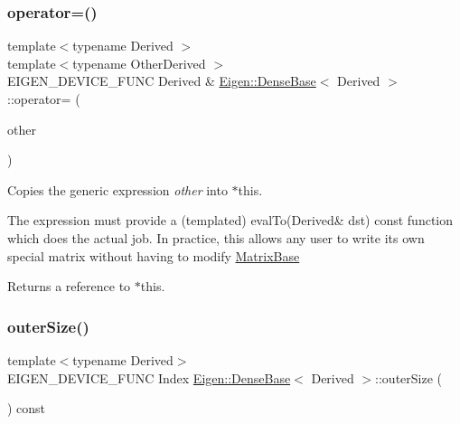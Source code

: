 \subsubsection{\texorpdfstring{operator=()}{operator=()}\hspace{0.1cm}{\footnotesize\ttfamily [3/3]}}
{\footnotesize\ttfamily template$<$typename Derived $>$ \\
template$<$typename Other\+Derived $>$ \\
E\+I\+G\+E\+N\+\_\+\+D\+E\+V\+I\+C\+E\+\_\+\+F\+U\+NC Derived \& \mbox{\hyperlink{class_eigen_1_1_dense_base}{Eigen\+::\+Dense\+Base}}$<$ Derived $>$\+::operator= (\begin{DoxyParamCaption}\item[{const \mbox{\hyperlink{struct_eigen_1_1_eigen_base}{Eigen\+Base}}$<$ Other\+Derived $>$ \&}]{other }\end{DoxyParamCaption})}



Copies the generic expression {\itshape other} into $\ast$this. 

The expression must provide a (templated) eval\+To(\+Derived\& dst) const function which does the actual job. In practice, this allows any user to write its own special matrix without having to modify \mbox{\hyperlink{class_eigen_1_1_matrix_base}{Matrix\+Base}}

\begin{DoxyReturn}{Returns}
a reference to $\ast$this. 
\end{DoxyReturn}
\mbox{\label{class_eigen_1_1_dense_base_ad78fff11f12aefa46318ae88b6efcc50}} 
\subsubsection{\texorpdfstring{outerSize()}{outerSize()}}
{\footnotesize\ttfamily template$<$typename Derived$>$ \\
E\+I\+G\+E\+N\+\_\+\+D\+E\+V\+I\+C\+E\+\_\+\+F\+U\+NC Index \mbox{\hyperlink{class_eigen_1_1_dense_base}{Eigen\+::\+Dense\+Base}}$<$ Derived $>$\+::outer\+Size (\begin{DoxyParamCaption}{ }\end{DoxyParamCaption}) const\hspace{0.3cm}{\ttfamily [inline]}}

